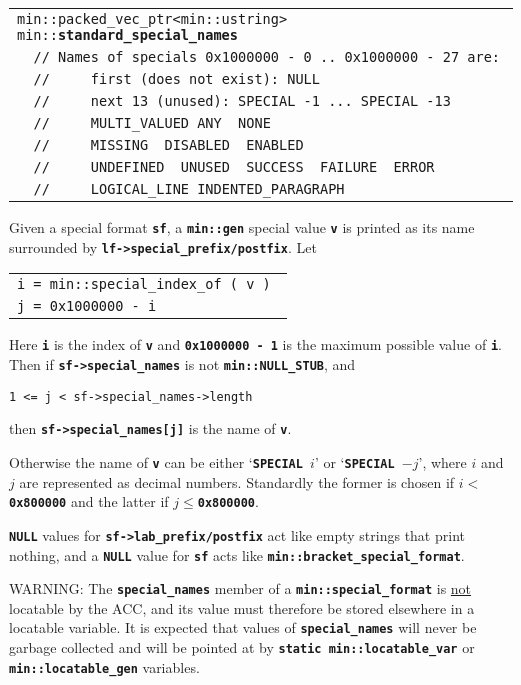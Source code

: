 \documentclass[12pt]{article}
\makeatletter
\newcommand{\TT}[1]{{\tt \bfseries #1}}
\newcommand{\ttindex}[1]{\index{#1@{\tt #1}}}
\newcommand{\EOL}{\penalty \exhyphenpenalty}
\newenvironment{indpar}[1][0.3in]%
	{\begin{list}{}%
		     {\setlength{\itemsep}{0in}%
		      \setlength{\topsep}{0in}%
		      \setlength{\parsep}{1ex}%
		      \setlength{\labelwidth}{#1}%
		      \setlength{\leftmargin}{#1}%
		      \addtolength{\leftmargin}{\labelsep}}%
	 \item}%
	{\end{list}}
\newcommand{\LABEL}[1]{\label{#1}}
\newlength{\ARGBREAKLENGTH}
\newcommand{\ARGBREAK}[1][\ARGBREAKLENGTH]{\\&\hspace*{#1}}
\newcommand{\MINKEY}[1]%
	   {\TT{#1}\ttindex{min::#1}\ttindex{#1}}
\makeatother
\begin{document}
\begin{indpar}[1em]\begin{tabular}{rl}
\multicolumn{2}{l}{\tt min::packed\_vec\_ptr<min::ustring>
    min::\MINKEY{standard\_\EOL special\_\EOL names}}
\LABEL{MIN::STANDARD_SPECIAL_NAMES}\ARGBREAK
\verb|// Names of specials 0x1000000 - 0 .. 0x1000000 - 27 are:|\ARGBREAK
\verb|//     first (does not exist): NULL|\ARGBREAK
\verb|//     next 13 (unused): SPECIAL -1 ... SPECIAL -13|\ARGBREAK
\verb|//     MULTI_VALUED ANY  NONE|\ARGBREAK
\verb|//     MISSING  DISABLED  ENABLED|\ARGBREAK
\verb|//     UNDEFINED  UNUSED  SUCCESS  FAILURE  ERROR|\ARGBREAK
\verb|//     LOGICAL_LINE INDENTED_PARAGRAPH|
\end{tabular}\end{indpar}

Given a special format \TT{sf},
a \TT{min::gen} special value \TT{v} is printed as its name surrounded
by \TT{lf->\EOL special\_\EOL prefix/\EOL postfix}.
Let
\begin{center}
\begin{tabular}{l}
\tt i = min::special\_index\_of ( v ) \\
\tt j = 0x1000000 - i
\end{tabular}
\end{center}
Here \TT{i} is the index of \TT{v} and \TT{0x1000000 - 1}
is the maximum possible
value of \TT{i}.
Then if \TT{sf->\EOL special\_\EOL names} is not \TT{min::\EOL NULL\_\EOL STUB},
and
\begin{center}
\tt 1 <= j < sf->special\_names->length
\end{center}
then \TT{sf->\EOL special\_\EOL names[j]} is the name of \TT{v}.

Otherwise the name of \TT{v} can be either
`\TT{SPECIAL }$i$' or `\TT{SPECIAL }$-j$', where $i$ and $j$ are
represented as decimal numbers.  Standardly the former is chosen
if $i<$\TT{0x800000} and the latter if $j\le$\TT{0x800000}.

\TT{NULL} values for
\TT{sf->\EOL lab\_\EOL prefix/postfix} act like empty strings
that print nothing, and a \TT{NULL} value for \TT{sf} acts like
\TT{min::\EOL bracket\_\EOL special\_\EOL format}.

WARNING: The \TT{special\_\EOL names} member of a \TT{min::special\_format} is
\underline{not} locatable by the ACC, and its value must therefore be
stored elsewhere in a locatable variable.  It is expected that values of
\TT{special\_\EOL names} will never be garbage collected and
will be pointed at by \TT{static min::\EOL locatable\_\EOL var} or
\TT{min::\EOL locatable\_\EOL gen} variables.
\end{document}
